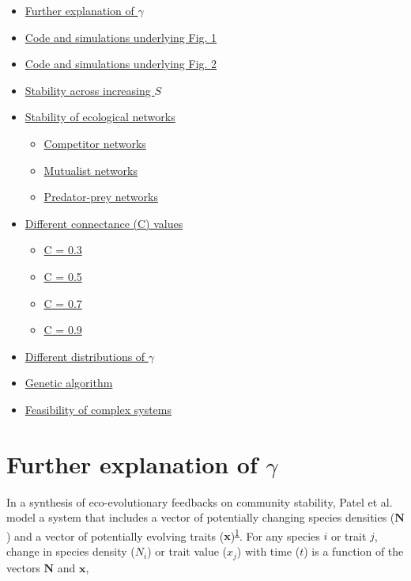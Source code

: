 \documentclass[]{article}
\providecommand{\tightlist}{%
  \setlength{\itemsep}{0pt}\setlength{\parskip}{0pt}}
\providecommand{\tightlist}{%
  \setlength{\itemsep}{0pt}\setlength{\parskip}{0pt}}
\begin{document}
\begin{itemize}
\tightlist
\item
  \protect\hyperlink{moregamma}{Further explanation of \(\gamma\)}
\item
  \protect\hyperlink{Fig1}{Code and simulations underlying Fig. 1}
\item
  \protect\hyperlink{Fig2}{Code and simulations underlying Fig. 2}
\item
  \protect\hyperlink{IncrS}{Stability across increasing \(S\)}
\item
  \protect\hyperlink{ecological}{Stability of ecological networks}

  \begin{itemize}
  \tightlist
  \item
    \protect\hyperlink{competition}{Competitor networks}
  \item
    \protect\hyperlink{mutualism}{Mutualist networks}
  \item
    \protect\hyperlink{pred-prey}{Predator-prey networks}
  \end{itemize}
\item
  \protect\hyperlink{connectance}{Different connectance (C) values}

  \begin{itemize}
  \tightlist
  \item
    \protect\hyperlink{connect3}{C = 0.3}
  \item
    \protect\hyperlink{connect5}{C = 0.5}
  \item
    \protect\hyperlink{connect7}{C = 0.7}
  \item
    \protect\hyperlink{connect9}{C = 0.9}
  \end{itemize}
\item
  \protect\hyperlink{gam_dist}{Different distributions of \(\gamma\)}
\item
  \protect\hyperlink{ga}{Genetic algorithm}
\item
  \protect\hyperlink{Feasibility}{Feasibility of complex systems}
\end{itemize}

\hypertarget{moregamma}{\section{\texorpdfstring{Further explanation of
\(\gamma\)}{Further explanation of \textbackslash{}gamma}}\label{moregamma}}

In a synthesis of eco-evolutionary feedbacks on community stability,
Patel et al. model a system that includes a vector of potentially
changing species densities (\(\mathbf{N}\)) and a vector of potentially
evolving traits
(\(\mathbf{x}\))\textsuperscript{\protect\hyperlink{ref-Patel2018}{1}}.
For any species \(i\) or trait \(j\), change in species density
(\(N_{i}\)) or trait value (\(x_{j}\)) with time (\(t\)) is a function
of the vectors \(\mathbf{N}\) and \(\mathbf{x}\),
\end{document}
